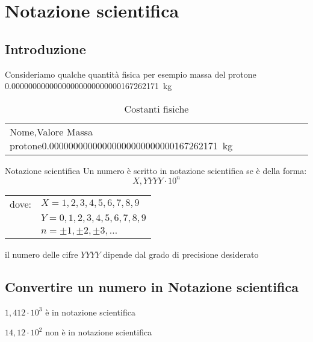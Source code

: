 \chapter{Notazione scientifica}
\section{Introduzione}
Consideriamo qualche quantità fisica per esempio massa del protone \SI{0,00000000000000000000000000167262171}{\kilogram}


\begin{table}
	\caption{Costanti fisiche}
	\label{tab:costantifisiche1}
	\centering
	\begin{tabular}{lS}
		\toprule
		Nome,Valore
		\midrule
	Massa protone\SI{0,00000000000000000000000000167262171}{\kilogram}
		\bottomrule
	\end{tabular}
\end{table}
\label{cha:NotazioneScientifica}
\begin{definizionet}{Notazione scientifica}{}
Un numero è scritto in notazione scientifica se è della forma:
\[X,YYYY \cdot 10^n \]
\begin{tabular}{ll}
dove:&    $X=1,2,3,4,5,6,7,8,9$  \\ 
	    &     $ Y=0,1,2,3,4,5,6,7,8,9$ \\ 
	   &  $n=\pm 1, \pm 2,\pm 3,\ldots$\\
\end{tabular}
 
il numero delle cifre $YYYY$ dipende dal grado di precisione desiderato
\end{definizionet}
\section{Convertire un numero in Notazione scientifica}
\begin{esempiot}{}{}
	$1,412\cdot 10^3$ è in notazione scientifica
	
	$14,12\cdot 10^2$ non è in notazione scientifica
\end{esempiot}